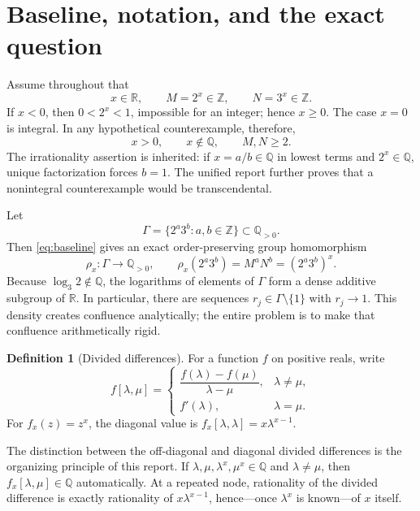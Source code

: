 \documentclass[11pt,oneside]{article}
\theoremstyle{definition}
\newtheorem{definition}[theorem]{Definition}
\theoremstyle{remark}
\newcommand{\Z}{\mathbb Z}
\newcommand{\Q}{\mathbb Q}
\newcommand{\R}{\mathbb R}
\begin{document}
\section{Baseline, notation, and the exact question}
\label{sec:baseline}

Assume throughout that
\begin{equation}
 x\in\R,\qquad M=2^x\in\Z,\qquad N=3^x\in\Z.
 \label{eq:baseline}
\end{equation}
If $x<0$, then $0<2^x<1$, impossible for an integer; hence $x\ge0$.  The case $x=0$ is
integral.  In any hypothetical counterexample, therefore,
\begin{equation}
 x>0,
 \qquad x\notin\Q,
 \qquad M,N\ge2.
 \label{eq:hypothetical}
\end{equation}
The irrationality assertion is inherited: if $x=a/b\in\Q$ in lowest terms and $2^x\in\Q$,
unique factorization forces $b=1$.  The unified report further proves that a nonintegral
counterexample would be transcendental.

Let
\begin{equation}
 \Gamma=\{2^a3^b:a,b\in\Z\}\subset\Q_{>0}.
 \label{eq:gamma}
\end{equation}
Then \eqref{eq:baseline} gives an exact order-preserving group homomorphism
\begin{equation}
 \rho_x:\Gamma\longrightarrow\Q_{>0},
 \qquad
 \rho_x(2^a3^b)=M^aN^b=(2^a3^b)^x.
 \label{eq:rho}
\end{equation}
Because $\log_3 2\notin\Q$, the logarithms of elements of $\Gamma$ form a dense additive
subgroup of $\R$.  In particular, there are sequences $r_j\in\Gamma\setminus\{1\}$ with
$r_j\to1$.  This density creates confluence analytically; the entire problem is to make that
confluence arithmetically rigid.

\begin{definition}[Divided differences]
For a function $f$ on positive reals, write
\[
 f[\lambda,\mu]=
 \begin{cases}
 \dfrac{f(\lambda)-f(\mu)}{\lambda-\mu},&\lambda\ne\mu,\\[1.1ex]
 f'(\lambda),&\lambda=\mu.
 \end{cases}
\]
For $f_x(z)=z^x$, the diagonal value is
$f_x[\lambda,\lambda]=x\lambda^{x-1}$.
\end{definition}

The distinction between the off-diagonal and diagonal divided differences is the organizing
principle of this report.  If $\lambda,\mu,\lambda^x,\mu^x\in\Q$ and $\lambda\ne\mu$, then
$f_x[\lambda,\mu]\in\Q$ automatically.  At a repeated node, rationality of the divided
difference is exactly rationality of $x\lambda^{x-1}$, hence---once $\lambda^x$ is known---of
$x$ itself.
\end{document}

